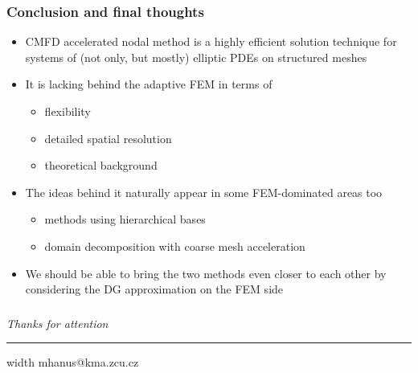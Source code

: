 \begin{frame}[c]
	\frametitle{Conclusion and final thoughts}
	 \begin{itemize}
	 	\item CMFD accelerated nodal method is a highly efficient 
	 	      solution technique for systems of (not only, but mostly) elliptic PDEs on structured meshes\pause
	 	\item It is lacking behind the adaptive FEM in terms of
	 	\begin{itemize}
	 	    \item flexibility
	 	    \item detailed spatial resolution
	 	    \item theoretical background\pause
	 	\end{itemize}
	 	\item The ideas behind it naturally appear in some FEM-dominated areas too
	 	\begin{itemize}
	 		\item methods using hierarchical bases
	 		\item domain decomposition with coarse mesh acceleration\pause
	 	\end{itemize}
	 	\item We should be able to bring the two methods even closer to each other by considering the
	 	      DG approximation on the FEM side
	 \end{itemize}
\end{frame}

\begin{frame}[c]
	\frametitle{}
	\begin{center}
	  \LARGE\emph{ Thanks for attention }\\[.5em]
	  \hrule width \textwidth\vspace{.5em}
	  \normalsize\color{structure} mhanus@kma.zcu.cz
	\end{center}
\end{frame}


